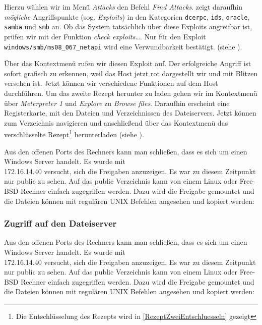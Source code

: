 Hierzu wählen wir im Menü \emph{Attacks} den Befehl \emph{\glqq{}Find Attacks\grqq{}}. \Armitage{} zeigt daraufhin \emph{mögliche} Angriffspunkte (sog. \emph{Exploits}) in den Kategorien \texttt{dcerpc}, \texttt{ids}, \texttt{oracle}, \texttt{samba} und \texttt{smb} an. Ob das System tatsächlich über diese Exploits angreifbar ist, prüfen wir mit der Funktion \emph{\glqq{}check exploits\ldots\grqq{}}. Nur für den Exploit \texttt{windows/smb/ms08\_067\_netapi} wird eine Verwundbarkeit bestätigt. (siehe ).


Über das Kontextmenü rufen wir diesen Exploit auf. Der erfolgreiche Angriff ist sofort grafisch zu erkennen, weil das Host 
jetzt rot dargestellt wir und mit Blitzen versehen ist. Jetzt können wir verschiedene Funktionen auf dem Host durchführen.
Um das zweite Rezept herunter zu laden gehen wir im Kontextmenü über \emph{Meterpreter 1} und \emph{Explore} zu \emph{\glqq{}Browse files\grqq{}}. Daraufhin erscheint eine Registerkarte, mit den Dateien und Verzeichnissen des Dateiservers. Jetzt können zum Verzeichnis  navigieren und anschließend über das Kontextmenü das verschlüsselte Rezept\footnote{Die Entschlüsselung des Rezepts wird in \cref{RezeptZweiEntschluesseln} gezeigt} herunterladen (siehe ).


Aus den offenen Ports des Rechners  kann man
schließen, dass es sich um einen Windows Server handelt. Es wurde mit
\\172.16.14.40 versucht, sich die Freigaben anzuzeigen. Es war zu diesem
Zeitpunkt nur public zu sehen. Auf das public Verzeichnis kann von einem Linux
oder Free-BSD Rechner einfach zugegriffen werden. Dazu wird die Freigabe
\glqq{}gemountet\grqq{} und die Dateien können mit regulären UNIX Befehlen angesehen und
kopiert werden:

\subsubsection{Zugriff auf den Dateiserver}

Aus den offenen Ports des Rechners  kann man
schließen, dass es sich um einen Windows Server handelt. Es wurde mit
\\172.16.14.40 versucht, sich die Freigaben anzuzeigen. Es war zu diesem
Zeitpunkt nur public zu sehen. Auf das public Verzeichnis kann von einem Linux
oder Free-BSD Rechner einfach zugegriffen werden. Dazu wird die Freigabe
\glqq{}gemountet\grqq{} und die Dateien können mit regulären UNIX Befehlen angesehen und
kopiert werden:

